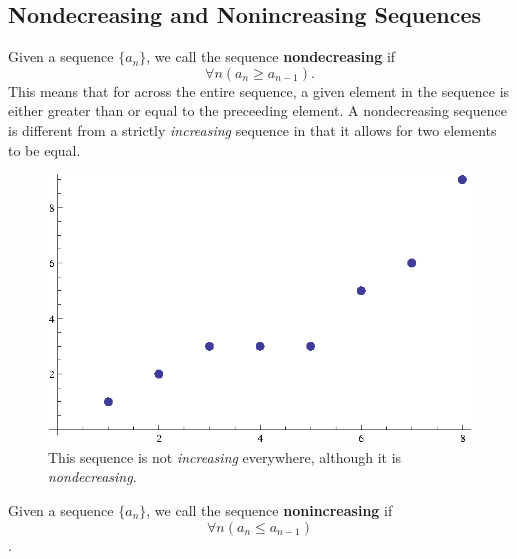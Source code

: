 \subsection{Nondecreasing and Nonincreasing Sequences}\label{nondecreasing}
\begin{defn}
  Given a sequence \(\{a_n\}\), we call the sequence \textbf{nondecreasing} if
  \[\forall n (a_n \geq a_{n-1})\text{.}\]
  This means that for across the entire sequence, a given element in the sequence is either greater than or equal to the preceeding element.
  A nondecreasing sequence is different from a strictly \emph{increasing} sequence in that it allows for two elements to be equal.
  \begin{figure}[H]
    \begin{center}
      \includegraphics[scale=0.5]{continuous/sequence/nondecreasing.eps}
    \end{center}
    \caption{This sequence is not \emph{increasing} everywhere, although it is \emph{nondecreasing}.}
  \end{figure}
\end{defn}
\begin{defn}
  Given a sequence \(\{a_n\}\), we call the sequence \textbf{nonincreasing} if
  \[\forall n (a_n \leq a_{n-1})\].
\end{defn}
